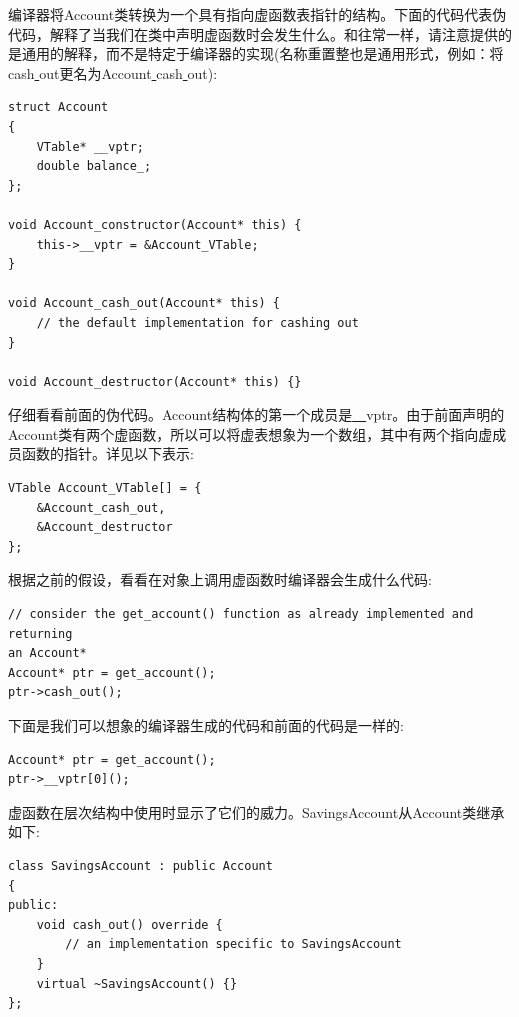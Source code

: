 编译器将Account类转换为一个具有指向虚函数表指针的结构。下面的代码代表伪代码，解释了当我们在类中声明虚函数时会发生什么。和往常一样，请注意提供的是通用的解释，而不是特定于编译器的实现(名称重置整也是通用形式，例如：将cash\underline{ }out更名为Account\underline{ }cash\underline{ }out): \par

\begin{lstlisting}[caption={}]
struct Account
{
	VTable* __vptr;
	double balance_;
};

void Account_constructor(Account* this) {
	this->__vptr = &Account_VTable;
}

void Account_cash_out(Account* this) {
	// the default implementation for cashing out
}

void Account_destructor(Account* this) {}
\end{lstlisting}

仔细看看前面的伪代码。Account结构体的第一个成员是\underline{~~}vptr。由于前面声明的Account类有两个虚函数，所以可以将虚表想象为一个数组，其中有两个指向虚成员函数的指针。详见以下表示:\par

\begin{lstlisting}[caption={}]
VTable Account_VTable[] = {
	&Account_cash_out,
	&Account_destructor
};
\end{lstlisting}

根据之前的假设，看看在对象上调用虚函数时编译器会生成什么代码: \par

\begin{lstlisting}[caption={}]
// consider the get_account() function as already implemented and returning
an Account*
Account* ptr = get_account();
ptr->cash_out();
\end{lstlisting}

下面是我们可以想象的编译器生成的代码和前面的代码是一样的: \par

\begin{lstlisting}[caption={}]
Account* ptr = get_account();
ptr->__vptr[0]();
\end{lstlisting}

虚函数在层次结构中使用时显示了它们的威力。SavingsAccount从Account类继承如下: \par

\begin{lstlisting}[caption={}]
class SavingsAccount : public Account
{
public:
	void cash_out() override {
		// an implementation specific to SavingsAccount
	}
	virtual ~SavingsAccount() {}
};
\end{lstlisting}

